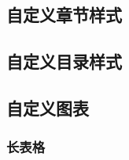 \documentclass{ctexart}
\begin{document}
    \subsection{自定义章节样式}
    \subsection{自定义目录样式}
    \subsection{自定义图表}
        \subsubsection{长表格}
            
\end{document}
